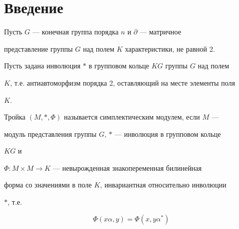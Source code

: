 

\date{}







\pagestyle{plain} %













\maketitle


\label{begin}


\section*{Введение}





Пусть $G$ --- конечная группа порядка $n$ и $\partial$ --- матричное


представление группы $G$ над полем $K$ характеристики, не равной 2.


Пусть задана инволюция $*$ в групповом кольце $KG$ группы $G$ над полем


$K$, т.е. антиавтоморфизм порядка 2, оставляющий на месте элементы поля


$K$.


Тройка $(M,*,\Phi)$ называется симплектическим модулем, если $M$ ---


модуль представления группы $G$, $*$ --- инволюция в групповом кольце


$KG$ и


$\Phi:M\times M\to K$ --- невырожденная знакопеременная билинейная


форма со значениями в поле $K$, инвариантная относительно инволюции


$*$, т.е.


\begin{equation}


\Phi(x\alpha,y)=\Phi(x,y\alpha^*)


\end{equation}


